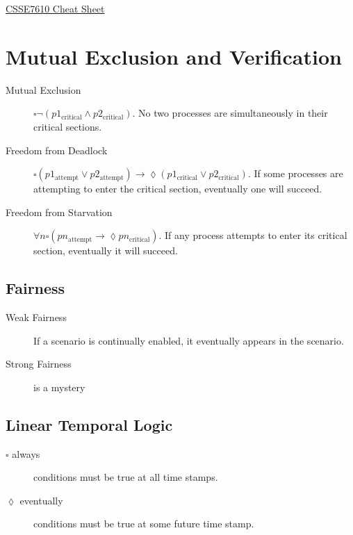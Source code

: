 \documentclass[landscape]{cheat}
\begin{document}
\begin{multicols*}{3}

\begin{center}
\Large{\underline{CSSE7610 Cheat Sheet}} \\
\end{center}

\section{Mutual Exclusion and Verification}
\begin{description}
    \item[Mutual Exclusion] $\square \lnot(p1_\text{critical} \land p2_\text{critical})$.
        No two processes are simultaneously in their critical sections.
    \item[Freedom from Deadlock] $\square (p1_\text{attempt} \lor p2_\text{attempt}) \rightarrow
        \lozenge (p1_\text{critical} \lor p2_\text{critical})$.
        If some processes are attempting to enter the critical section, eventually one will succeed.
    \item[Freedom from Starvation] $\forall n \square \left(pn_\text{attempt} \rightarrow \lozenge pn_\text{critical}\right)$.
        If any process attempts to enter its critical section, eventually it will succeed.
\end{description}

\subsection{Fairness}
\begin{description}
    \item[Weak Fairness] If a scenario is continually enabled, it eventually appears in the scenario.
    \item[Strong Fairness] is a mystery
\end{description}

\subsection{Linear Temporal Logic}
\begin{description}
    \item[$\square$ always] conditions must be true at all time stamps.
    \item[$\lozenge$ eventually] conditions must be true at some future time stamp.
\end{description}


\end{multicols*}
\end{document}
